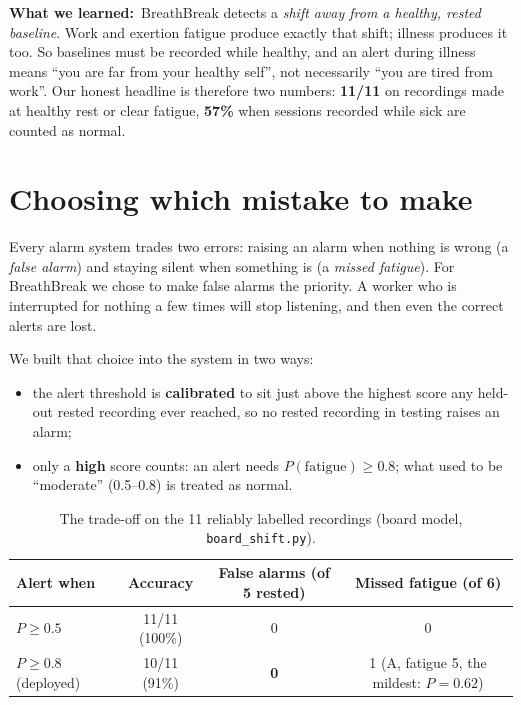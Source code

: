 \documentclass[11pt]{article}
\newcommand{\rowband}{\rowcolors{2}{bblight}{white}}
\newcommand{\lesson}[1]{\begin{lessonbox}\textbf{\color{bbnavy}What we learned:}\ #1\end{lessonbox}}
\begin{document}
\lesson{BreathBreak detects a \emph{shift away from a healthy, rested baseline}. Work and exertion fatigue
produce exactly that shift; illness produces it too. So baselines must be recorded while healthy, and an
alert during illness means ``you are far from your healthy self'', not necessarily ``you are tired from
work''. Our honest headline is therefore two numbers: \textbf{11/11} on recordings made at healthy rest or
clear fatigue, \textbf{57\%} when sessions recorded while sick are counted as normal.}

\section{Choosing which mistake to make}

Every alarm system trades two errors: raising an alarm when nothing is wrong (a \emph{false alarm}) and
staying silent when something is (a \emph{missed fatigue}). For BreathBreak we chose to make false alarms
the priority. A worker who is interrupted for nothing a few times will stop listening, and then even the
correct alerts are lost.

We built that choice into the system in two ways:
\begin{itemize}
  \item the alert threshold is \textbf{calibrated} to sit just above the highest score any held-out rested
  recording ever reached, so no rested recording in testing raises an alarm;
  \item only a \textbf{high} score counts: an alert needs $P(\text{fatigue})\ge 0.8$; what used to be
  ``moderate'' (0.5--0.8) is treated as normal.
\end{itemize}

\begin{table}[h]
\centering
\caption{The trade-off on the 11 reliably labelled recordings (board model, \texttt{board\_shift.py}).}
\rowband\begin{tabular}{lccc}
\toprule
Alert when & Accuracy & False alarms (of 5 rested) & Missed fatigue (of 6) \\
\midrule
$P\ge0.5$ & 11/11 (100\%) & 0 & 0 \\
$P\ge0.8$ (deployed) & 10/11 (91\%) & \textbf{0} & 1 (A, fatigue 5, the mildest: $P=0.62$) \\
\bottomrule
\end{tabular}
\end{table}
\end{document}
